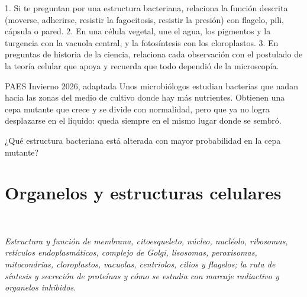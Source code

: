 \begin{clave} 1. Si te preguntan por una estructura bacteriana, relaciona la función descrita (moverse, adherirse, resistir la fagocitosis, resistir la presión) con flagelo, pili, cápsula o pared. 2. En una célula vegetal, une el agua, los pigmentos y la turgencia con la vacuola central, y la fotosíntesis con los cloroplastos. 3. En preguntas de historia de la ciencia, relaciona cada observación con el postulado de la teoría celular que apoya y recuerda que todo dependió de la microscopía.\end{clave}
\begin{elejemplo}{PAES Invierno 2026, adaptada}
Unos microbiólogos estudian bacterias que nadan hacia las zonas del medio de cultivo donde hay más nutrientes. Obtienen una cepa mutante que crece y se divide con normalidad, pero que ya no logra desplazarse en el líquido: queda siempre en el mismo lugar donde se sembró.

¿Qué estructura bacteriana está alterada con mayor probabilidad en la cepa mutante?
\end{elejemplo}

\section[Organelos y estructuras celulares]{Organelos y estructuras celulares}
\modcomun\ \ {\color{gris}\itshape Estructura y función de membrana, citoesqueleto, núcleo, nucléolo, ribosomas, retículos endoplasmáticos, complejo de Golgi, lisosomas, peroxisomas, mitocondrias, cloroplastos, vacuolas, centriolos, cilios y flagelos; la ruta de síntesis y secreción de proteínas y cómo se estudia con marcaje radiactivo y organelos inhibidos.\par}
